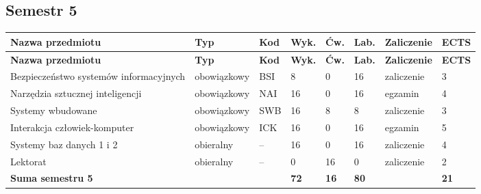\documentclass[12pt,a4paper]{article}
\newcommand{\thdrule}{\noalign{\global\setlength{\extrarowheight}{0pt}}}
\newcommand{\thdend}{\noalign{\global\setlength{\extrarowheight}{4pt}}}
\begin{document}
\clearpage
\subsection*{Semestr 5}

{\scriptsize
\begin{longtable}{m{5.0cm}m{1.9cm}m{0.75cm}m{0.85cm}m{0.85cm}m{0.85cm}m{1.45cm}m{0.9cm}}
\thdrule\toprule
\rowcolor{pjatkRed}
{\color{white}\footnotesize\textbf{\vphantom{Ag}Nazwa przedmiotu}} & {\color{white}\footnotesize\textbf{\vphantom{Ag}Typ}} & {\color{white}\footnotesize\textbf{\vphantom{Ag}Kod}} & {\color{white}\footnotesize\textbf{\vphantom{Ag}Wyk.}} & {\color{white}\footnotesize\textbf{\vphantom{Ag}Ćw.}} & {\color{white}\footnotesize\textbf{\vphantom{Ag}Lab.}} & {\color{white}\footnotesize\textbf{\vphantom{Ag}Zaliczenie}} & {\color{white}\footnotesize\textbf{\vphantom{Ag}ECTS}} \\
\midrule\thdend
\endfirsthead
\thdrule\toprule
\rowcolor{pjatkRed}
{\color{white}\footnotesize\textbf{\vphantom{Ag}Nazwa przedmiotu}} & {\color{white}\footnotesize\textbf{\vphantom{Ag}Typ}} & {\color{white}\footnotesize\textbf{\vphantom{Ag}Kod}} & {\color{white}\footnotesize\textbf{\vphantom{Ag}Wyk.}} & {\color{white}\footnotesize\textbf{\vphantom{Ag}Ćw.}} & {\color{white}\footnotesize\textbf{\vphantom{Ag}Lab.}} & {\color{white}\footnotesize\textbf{\vphantom{Ag}Zaliczenie}} & {\color{white}\footnotesize\textbf{\vphantom{Ag}ECTS}} \\
\midrule\thdend
\endhead
\rowcolor{tableRowLight} Bezpieczeństwo systemów informacyjnych & {\scriptsize obowiązkowy} & BSI & 8 & 0 & 16 & {\scriptsize zaliczenie} & 3 \\
\rowcolor{tableRowAlt} Narzędzia sztucznej inteligencji & {\scriptsize obowiązkowy} & NAI & 16 & 0 & 16 & {\scriptsize egzamin} & 4 \\
\rowcolor{tableRowLight} Systemy wbudowane & {\scriptsize obowiązkowy} & SWB & 16 & 8 & 8 & {\scriptsize zaliczenie} & 3 \\
\rowcolor{tableRowAlt} Interakcja człowiek-komputer & {\scriptsize obowiązkowy} & ICK & 16 & 0 & 16 & {\scriptsize egzamin} & 5 \\
\rowcolor{tableElective} Systemy baz danych 1 i 2 & {\scriptsize obieralny} & -- & 16 & 0 & 16 & {\scriptsize zaliczenie} & 4 \\
\rowcolor{tableElective} Lektorat & {\scriptsize obieralny} & -- & 0 & 16 & 0 & {\scriptsize zaliczenie} & 2 \\
\midrule[\heavyrulewidth]
\rowcolor{tableSummary} \textbf{Suma semestru 5} & & & \textbf{72} & \textbf{16} & \textbf{80} & & \textbf{21} \\
\bottomrule
\end{longtable}}
\end{document}

